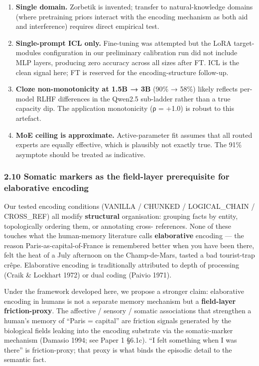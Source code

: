 \documentclass[
]{article}
\providecommand{\tightlist}{%
  \setlength{\itemsep}{0pt}\setlength{\parskip}{0pt}}
\begin{document}
\begin{enumerate}
\def\labelenumi{\arabic{enumi}.}
\tightlist
\item
  \textbf{Single domain.} Zorbetik is invented; transfer to
  natural-knowledge domains (where pretraining priors interact with the
  encoding mechanism as both aid and interference) requires direct
  empirical test.
\item
  \textbf{Single-prompt ICL only.} Fine-tuning was attempted but the
  LoRA target-modules configuration in our preliminary calibration run
  did not include MLP layers, producing zero accuracy across all sizes
  after FT. ICL is the clean signal here; FT is reserved for the
  encoding-structure follow-up.
\item
  \textbf{Cloze non-monotonicity at 1.5B → 3B} (90\% → 58\%) likely
  reflects per-model RLHF differences in the Qwen2.5 sub-ladder rather
  than a true capacity dip. The application monotonicity (ρ = +1.0) is
  robust to this artefact.
\item
  \textbf{MoE ceiling is approximate.} Active-parameter fit assumes that
  all routed experts are equally effective, which is plausibly not
  exactly true. The 91\% asymptote should be treated as indicative.
\end{enumerate}

\subsubsection{2.10 Somatic markers as the field-layer prerequisite for
elaborative
encoding}\label{somatic-markers-as-the-field-layer-prerequisite-for-elaborative-encoding}

Our tested encoding conditions (VANILLA / CHUNKED / LOGICAL\_CHAIN /
CROSS\_REF) all modify \textbf{structural} organisation: grouping facts
by entity, topologically ordering them, or annotating cross- references.
None of these touches what the human-memory literature calls
\textbf{elaborative} encoding --- the reason Paris-as-capital-of-France
is remembered better when you have been there, felt the heat of a July
afternoon on the Champ-de-Mars, tasted a bad tourist-trap crêpe.
Elaborative encoding is traditionally attributed to depth of processing
(Craik \& Lockhart 1972) or dual coding (Paivio 1971).

Under the framework developed here, we propose a stronger claim:
elaborative encoding in humans is not a separate memory mechanism but a
\textbf{field-layer friction-proxy}. The affective / sensory / somatic
associations that strengthen a human's memory of ``Paris = capital'' are
friction signals generated by the biological fields leaking into the
encoding substrate via the somatic-marker mechanism (Damasio 1994; see
Paper 1 §6.1c). ``I felt something when I was there'' is friction-proxy;
that proxy is what binds the episodic detail to the semantic fact.
\end{document}
